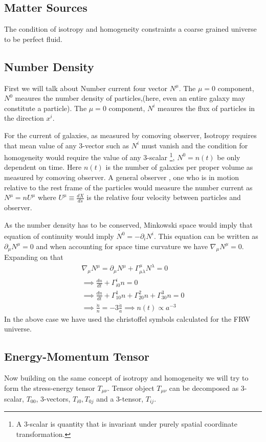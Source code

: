 \documentclass[12pt]{report}
\newcommand{\fn}[1]{\footnote{#1}}
\newcommand{\de}[2]{\frac{d{#1}}{d{#2}}}
\newcommand{\ch}[2]{\Gamma^{#1}_{#2}}
\newcommand{\p}{\partial}
\begin{document}
\subsection{Matter Sources}
The condition of isotropy and homogeneity constraints a coarse grained universe to be perfect fluid.
\subsection*{Number Density}
First we will talk about Number current four vector $N^\mu$. The $\mu=0$ component, $N^0$ meaures the number density of particles,(here, even an entire galaxy may constitute a particle). The $\mu=0$ component, $N^i$ meaures the flux of   particles in the direction $x^i$.

For the current of galaxies, as measured by comoving observer, Isotropy requires that mean value of any 3-vector such as $N^i$ must vanish and the condition for homogeneity would require the value of any 3-scalar \fn{A 3-scalar is quantity that is invariant under purely spatial coordinate transformation.}, $N^0=n(t)$ be only dependent on time. Here $n(t)$ is the number of galaxies per proper volume as measured by comoving observer. A general observer , one who is in motion relative to the rest frame of the particles would measure the number current as 
$N^\mu=n U^\mu$ where $U^\mu \equiv \de{X}{s}$ is the relative four velocity between particles and observer.

As the number density has to be conserved, Minkowski space would imply that equation of continuity would imply $\dot{N^0}=-\p_i N^i$. This equation can be written as $\p_\mu N^\mu=0$ and when accounting for space time curvature we have $\nabla_\mu N^\mu=0$.
Expanding on that 
\begin{eqnarray*}
\nabla_\mu N^\mu=\p_\mu N^\mu + \ch{\mu}{\mu \lambda}N^\lambda=0  \\
\implies \de{n}{t}+ \ch{i}{i0}n=0\\
\implies \de{n}{t}+ \ch{1}{10}n+ \ch{2}{20}n+ \ch{3}{30}n=0\\
\implies \frac{\dot{n}}{n}=-3\frac{\dot{a}}{a} \implies n(t) \propto a^{-3}
\end{eqnarray*}
In the above case we have used the christoffel symbols calculated for the FRW universe.
\subsection*{Energy-Momentum Tensor}
Now building on the same concept of isotropy and homogeneity we will try to form the stress-energy tensor $T_{\mu\nu}$. Tensor object
$T_{\mu\nu}$ can be decomposed as 3-scalar, $T_{00}$, 3-vectors, $T_{i0},T_{0j}$ and a 3-tensor, $T_{ij}$.
\end{document}
